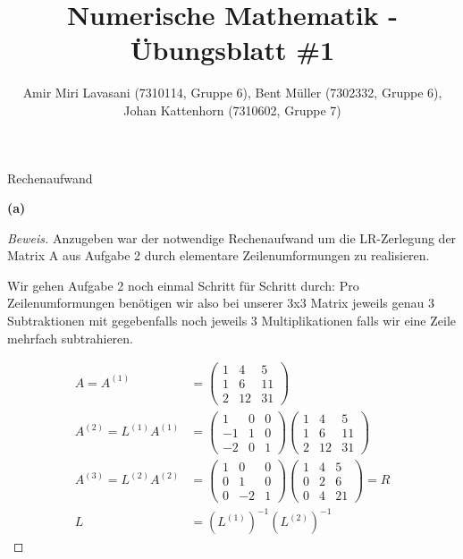 \documentclass[10pt]{article}
\newenvironment{Aufgabe}[2][Aufgabe]{\begin{trivlist}
\item[\hskip \labelsep {\bfseries #1}\hskip \labelsep {\bfseries #2.}]}{\end{trivlist}}
\begin{document}
 
\title{ \textbf{Numerische Mathematik - Übungsblatt \#1} }

\author{Amir Miri Lavasani (7310114, Gruppe 6), Bent Müller (7302332, Gruppe 6), \\ 
Johan Kattenhorn (7310602, Gruppe 7)} \maketitle
 
\begin{Aufgabe}{3}
	Rechenaufwand
\end{Aufgabe}

\textbf{(a)}

\begin{proof}[Beweis]
	Anzugeben war der notwendige Rechenaufwand um die LR-Zerlegung der Matrix A 
	aus Aufgabe 2 durch elementare Zeilenumformungen zu realisieren.

	Wir gehen Aufgabe 2 noch einmal Schritt für Schritt durch:
	Pro Zeilenumformungen benötigen wir also bei unserer 3x3 Matrix
	jeweils genau 3 Subtraktionen mit gegebenfalls noch jeweils
	3 Multiplikationen falls wir eine Zeile mehrfach subtrahieren.

	\begin{align}
		A = A^{(1)} &=
		\begin{pmatrix}
			1 & 4 & 5 \\
			1 & 6 & 11 \\
			2 & 12 & 31
		\end{pmatrix} \\
		A^{(2)} = L^{(1)} A^{(1)} &= 
		\begin{pmatrix}
			1 & 0 & 0 \\
			-1 & 1 & 0 \\
			-2 & 0 & 1 
		\end{pmatrix}
		\begin{pmatrix}
			1 & 4 & 5 \\
			1 & 6 & 11 \\
			2 & 12 & 31
		\end{pmatrix} \\
		A^{(3)} = L^{(2)} A^{(2)} &=
		\begin{pmatrix}
			1 & 0 & 0 \\
			0 & 1 & 0 \\
			0 & -2 & 1
		\end{pmatrix}
		\begin{pmatrix}
			1 & 4 & 5 \\
			0 & 2 & 6 \\
			0 & 4 & 21
		\end{pmatrix} 
		= R \\
		L &= (L^{(1)})^{-1} (L^{(2)})^{-1}
	\end{align}


\end{proof}
\end{document}
